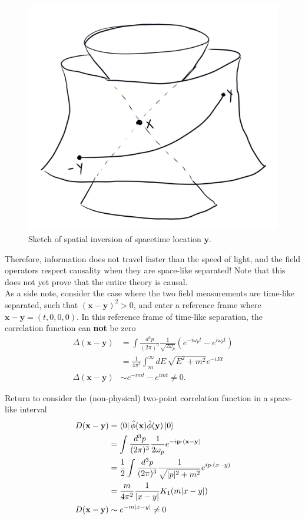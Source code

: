 \begin{figure}[H]
	\centering
	\includegraphics[scale=0.3]{inversion.png}
	\caption{Sketch of spatial inversion of spacetime location $\textbf{y}$.}
\end{figure}

\noindent Therefore, information does not travel faster than the speed of light, and the field operators respect causality when they are space-like separated! Note that this does not yet prove that the entire theory is causal. \\

\noindent As a side note, consider the case where the two field measurements are time-like separated, such that $(\textbf{x} - \textbf{y})^2 > 0$, and enter a reference frame where $\textbf{x} - \textbf{y} = (t, 0, 0, 0)$. In this reference frame of time-like separation, the correlation function can \textbf{not} be zero
\begin{align}
\Delta (\textbf{x} - \textbf{y}) &= \int \frac{d^3 p}{(2\pi)^3} \frac{1}{\sqrt{2 \omega_p}} \left( e^{-i\omega_p t} - e^{i\omega_p t} \right) \\
&= \frac{1}{4\pi^2} \int_m^{\infty} dE \, \sqrt{E^2 + m^2} e^{-iEt} \\
\Delta (\textbf{x} - \textbf{y}) &\sim e^{-imt} - e^{imt} \ne 0 .
\end{align}

\noindent Return to consider the (non-physical) two-point correlation function in a space-like interval
\begin{align}
D(\textbf{x}-\textbf{y}) &= \bra{0} \hat{\phi}(\textbf{x}) \hat{\phi}(\textbf{y}) \ket{0} \\
&= \int \frac{d^3 p}{(2\pi)^3} \frac{1}{2 \omega_p} e^{-i \textbf{p} \cdot (\textbf{x}-\textbf{y})} \\
&= \frac{1}{2} \int \frac{d^3 p}{(2\pi)^3} \frac{1}{\sqrt{|p|^2 + m^2}} e^{i p \cdot( x-y)} \\
&= \frac{m}{4\pi^2} \frac{1}{|x-y|} K_1(m|x-y|) \\
D(\textbf{x}-\textbf{y}) &\sim e^{-m|x-y|} \ne 0
\end{align}

